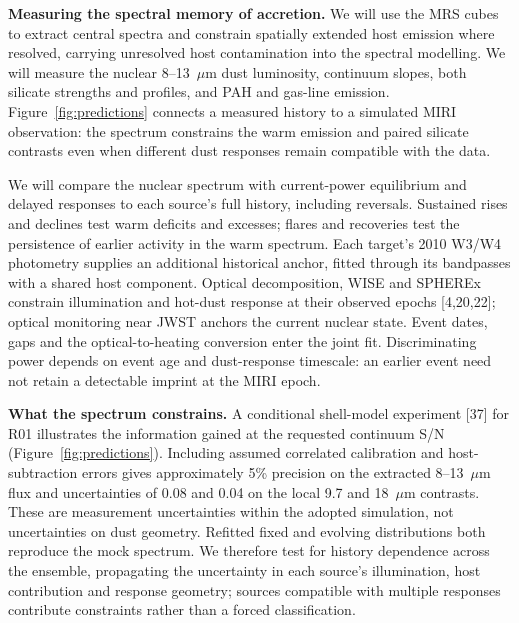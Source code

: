 \documentclass[12pt]{article}
\begin{document}
\clearpage
\noindent\textbf{Measuring the spectral memory of accretion.}
We will use the MRS cubes to extract central spectra and constrain spatially extended host emission where resolved, carrying unresolved host contamination into the spectral modelling. We will measure the nuclear 8--13~$\mu$m dust luminosity, continuum slopes, both silicate strengths and profiles, and PAH and gas-line emission. Figure~\ref{fig:predictions} connects a measured history to a simulated MIRI observation: the spectrum constrains the warm emission and paired silicate contrasts even when different dust responses remain compatible with the data.

We will compare the nuclear spectrum with current-power equilibrium and delayed responses to each source's full history, including reversals. Sustained rises and declines test warm deficits and excesses; flares and recoveries test the persistence of earlier activity in the warm spectrum. Each target's 2010 W3/W4 photometry supplies an additional historical anchor, fitted through its bandpasses with a shared host component. Optical decomposition, WISE and SPHEREx constrain illumination and hot-dust response at their observed epochs [4,20,22]; optical monitoring near JWST anchors the current nuclear state. Event dates, gaps and the optical-to-heating conversion enter the joint fit. Discriminating power depends on event age and dust-response timescale: an earlier event need not retain a detectable imprint at the MIRI epoch.

\noindent\textbf{What the spectrum constrains.} A conditional shell-model experiment [37] for R01 illustrates the information gained at the requested continuum S/N (Figure~\ref{fig:predictions}). Including assumed correlated calibration and host-subtraction errors gives approximately 5\% precision on the extracted 8--13~$\mu$m flux and uncertainties of 0.08 and 0.04 on the local 9.7 and 18~$\mu$m contrasts. These are measurement uncertainties within the adopted simulation, not uncertainties on dust geometry. Refitted fixed and evolving distributions both reproduce the mock spectrum. We therefore test for history dependence across the ensemble, propagating the uncertainty in each source's illumination, host contribution and response geometry; sources compatible with multiple responses contribute constraints rather than a forced classification.
\end{document}
